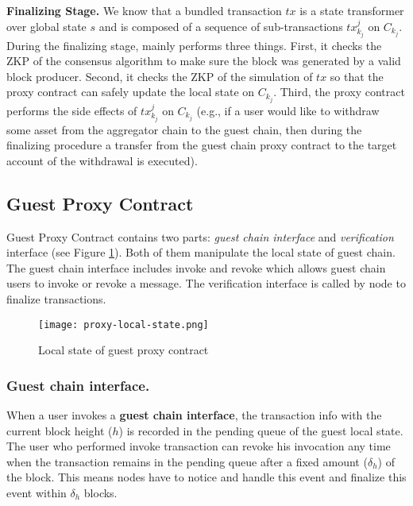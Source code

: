 \smallskip\noindent\textbf{Finalizing Stage.}
We know that a bundled transaction $tx$ is a state transformer over global state $s$ and is composed of a sequence of sub-transactions $tx^j_{k_j}$ on $C_{k_j}$. During the finalizing stage, \dprotocol mainly performs three things. First, it checks the ZKP of the consensus algorithm to make sure the block was generated by a valid block producer. Second, it checks the ZKP of the simulation of $tx$ so that the proxy contract can safely update the local state on $C_{k_j}$. Third, the proxy contract performs the side effects of $tx^j_{k_j}$ on $C_{k_j}$ (e.g., if a user would like to withdraw some asset from the aggregator chain to the guest chain, then during the finalizing procedure a transfer from the guest chain proxy contract to the target account of the withdrawal is executed).

\subsection{Guest Proxy Contract}
Guest Proxy Contract contains two parts: \emph{guest chain interface} and \emph{verification} interface (see Figure \ref{local-state}). Both of them manipulate the local state of guest chain. The guest chain interface includes invoke and revoke which allows guest chain users to invoke or revoke a message. The verification interface is called by \dprotocol node to finalize transactions.

\begin{figure}[!ht]
\centerline{\texttt{[image: proxy-local-state.png]}}
\caption{Local state of guest proxy contract}
\label{local-state}
\end{figure}

\subsubsection*{Guest chain interface.}
When a user invokes a {\bf guest chain interface}, the transaction info with the current block height ($h$) is recorded in the pending queue of the guest local state. The user who performed invoke transaction can revoke his invocation any time when the transaction remains in the pending queue after a fixed amount ($\delta_h$) of the block. This means \dprotocol nodes have to notice and handle this event and finalize this event within $\delta_h$ blocks.


